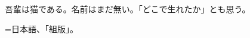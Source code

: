 \documentclass[tate,fontsize=12pt,paper=a6]{jlreq}
\begin{document}
吾輩は猫である。名前はまだ無い。「どこで生れたか」とも思う。

=\hbox{日本語、「組版」。}
\end{document}
